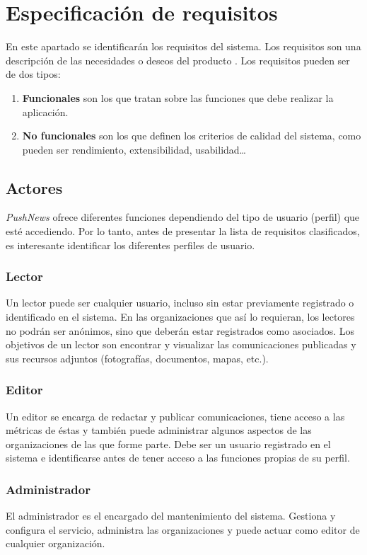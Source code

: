 \chapter{Especificación de requisitos}
En este apartado se identificarán los requisitos del sistema. Los requisitos son una descripción de las necesidades o deseos del producto \cite{Larman2004}. Los requisitos pueden ser de dos tipos:
\begin{enumerate}
    \item \textbf{Funcionales} son los que tratan sobre las funciones que debe realizar la aplicación.
    \item \textbf{No funcionales} son los que definen los criterios de calidad del sistema, como pueden ser rendimiento, extensibilidad, usabilidad\dots
\end{enumerate}

\section {Actores}
\emph{PushNews} ofrece diferentes funciones dependiendo del tipo de usuario (perfil) que esté accediendo. Por lo tanto, antes de presentar la lista de requisitos clasificados, es interesante identificar los diferentes perfiles de usuario.

\subsection{Lector}
Un lector puede ser cualquier usuario, incluso sin estar previamente registrado o identificado en el sistema. En las organizaciones que así lo requieran, los lectores no podrán ser anónimos, sino que deberán estar registrados como asociados. Los objetivos de un lector son encontrar y visualizar las comunicaciones publicadas y sus recursos adjuntos (fotografías, documentos, mapas, etc.).

\subsection{Editor}
Un editor se encarga de redactar y publicar comunicaciones, tiene acceso a las métricas de éstas y también puede administrar algunos aspectos de las organizaciones de las que forme parte. Debe ser un usuario registrado en el sistema e identificarse antes de tener acceso a las funciones propias de su perfil.

\subsection{Administrador}
El administrador es el encargado del mantenimiento del sistema. Gestiona y configura el servicio, administra las organizaciones y puede actuar como editor de cualquier organización.

